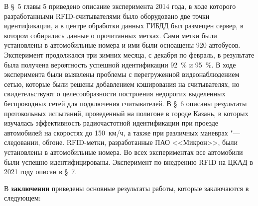 В \S~5 главы 5 приведено описание эксперимента 2014 года, в ходе которого разработанными RFID-считывателями было оборудовано две точки идентификации, а в центре обработки данных ГИБДД был размещен сервер, в котором собирались данные о прочитанных метках. Сами метки были установлены в автомобильные номера и ими были осноащены 920 автобусов. Эксперимент продолжался три зимних месяца, с декабря по февраль, в результате была получена вероятность успешной идентификации 92~\% и 95~\%. В ходе эксперимента были выявлены проблемы с перегруженной видеонаблюдением сетью, которые были решены добавлением кэширования на считывателях, но свидетельствуют о целесообразности построения недорогих выделенных беспроводных сетей для подключения считывателей. В \S~6 описаны результаты протокольных испытаний, проведенный на полигоне в городе Казань, в которых изучалась эффективность радиочастотной идентификации при проезде автомобилей на скоростях до 150~км/ч, а также при различных маневрах "--- следовании, обгоне. RFID-метки, разработанные ПАО <<Микрон>>, были установлены в автомобильные номера. Во всех экспериментах все автомобили были успешно идентифицированы. Эксперимент по внедрению RFID на ЦКАД в 2021 году описан в \S~7.


\FloatBarrier
{}                                  %
В \textbf{заключении} приведены основные результаты работы, которые заключаются в следующем:



